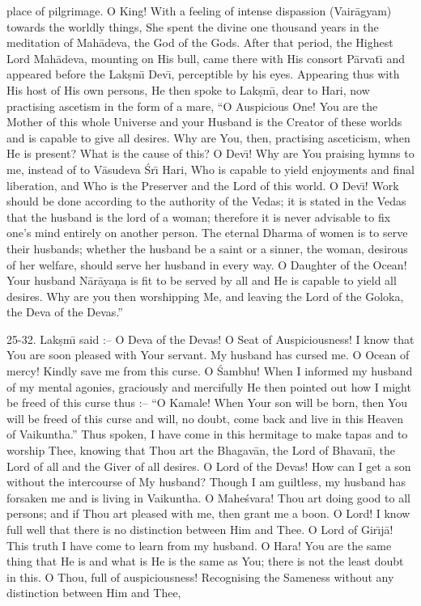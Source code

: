place of pilgrimage. O King! With a feeling of intense dispassion (Vair\=agyam) towards the worldly things, She spent the divine one thousand years in the meditation of Mah\=adeva, the God of the Gods. After that period, the Highest Lord Mah\=adeva, mounting on His bull, came there with His consort P\=arvat\={\i} and appeared before the Lak\d{s}m\={\i} Dev\={\i}, perceptible by his eyes. Appearing thus with His host of His own persons, He then spoke to Lak\d{s}m\={\i}, dear to Hari, now practising ascetism in the form of a mare, ``O Auspicious One! You are the Mother of this whole Universe and your Husband is the Creator of these worlds and is capable to give all desires. Why are You, then, practising asceticism, when He is present? What is the cause of this? O Dev\={\i}! Why are You praising hymns to me, instead of to V\=asudeva \'Sr\={\i} Hari, Who is capable to yield enjoyments and final liberation, and Who is the Preserver and the Lord of this world. O Dev\={\i}! Work should be done according to the authority of the Vedas; it is stated in the Vedas that the husband is the lord of a woman; therefore it is never advisable to fix one's mind entirely on another person. The eternal Dharma of women is to serve their husbands; whether the husband be a saint or a sinner, the woman, desirous of her welfare, should serve her husband in every way. O Daughter of the Ocean! Your husband N\=ar\=aya\d{n}a is fit to be served by all and He is capable to yield all desires. Why are you then worshipping Me, and leaving the Lord of the Goloka, the Deva of the Devas.''

25-32. Lak\d{s}m\={\i} said :-- O Deva of the Devas! O Seat of Auspiciousness! I know that You are soon pleased with Your servant. My husband has cursed me. O Ocean of mercy! Kindly save me from this curse. O \'Sambhu! When I informed my husband of my mental agonies, graciously and mercifully He then pointed out how I might be freed of this curse thus :-- ``O Kamale! When Your son will be born, then You will be freed of this curse and will, no doubt, come back and live in this Heaven of Vaikuntha.'' Thus spoken, I have come in this hermitage to make tapas and to worship Thee, knowing that Thou art the Bhagav\=an, the Lord of Bhavan\={\i}, the Lord of all and the Giver of all desires. O Lord of the Devas! How can I get a son without the intercourse of My husband? Though I am guiltless, my husband has forsaken me and is living in Vaikuntha. O Mahe\'svara! Thou art doing good to all persons; and if Thou art pleased with me, then grant me a boon. O Lord! I know full well that there is no distinction between Him and Thee. O Lord of Gir\={\i}j\=a! This truth I have come to learn from my husband. O Hara! You are the same thing that He is and what is He is the same as You; there is not the least doubt in this. O Thou, full of auspiciousness! Recognising the Sameness without any distinction between Him and Thee,

